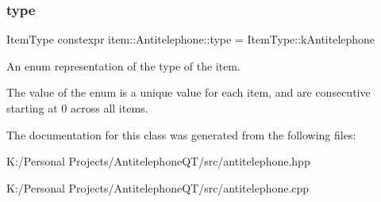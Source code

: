 \subsubsection{\texorpdfstring{type}{type}}
{\footnotesize\ttfamily Item\+Type constexpr item\+::\+Antitelephone\+::type = Item\+Type\+::k\+Antitelephone\hspace{0.3cm}{\ttfamily [static]}}



An enum representation of the type of the item. 

The value of the enum is a unique value for each item, and are consecutive starting at 0 across all items. 

The documentation for this class was generated from the following files\+:\begin{DoxyCompactItemize}
\item 
K\+:/\+Personal Projects/\+Antitelephone\+Q\+T/src/antitelephone.\+hpp\item 
K\+:/\+Personal Projects/\+Antitelephone\+Q\+T/src/antitelephone.\+cpp\end{DoxyCompactItemize}
